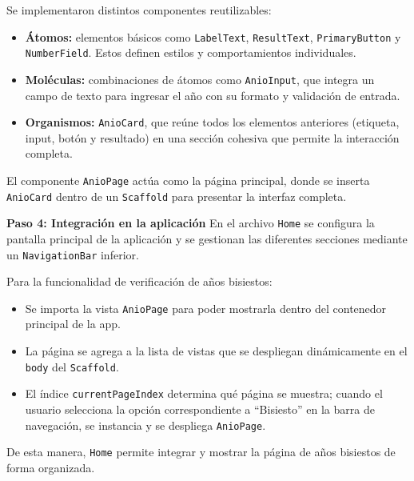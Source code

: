 Se implementaron distintos componentes reutilizables:  
\begin{itemize}
    \item \textbf{Átomos:} elementos básicos como \texttt{LabelText}, \texttt{ResultText}, \texttt{PrimaryButton} y \texttt{NumberField}. Estos definen estilos y comportamientos individuales.
    \item \textbf{Moléculas:} combinaciones de átomos como \texttt{AnioInput}, que integra un campo de texto para ingresar el año con su formato y validación de entrada.
    \item \textbf{Organismos:} \texttt{AnioCard}, que reúne todos los elementos anteriores (etiqueta, input, botón y resultado) en una sección cohesiva que permite la interacción completa.
\end{itemize}

El componente \texttt{AnioPage} actúa como la página principal, donde se inserta \texttt{AnioCard} dentro de un \texttt{Scaffold} para presentar la interfaz completa.  

\textbf{Paso 4: Integración en la aplicación}  
En el archivo \texttt{Home} se configura la pantalla principal de la aplicación y se gestionan las diferentes secciones mediante un \texttt{NavigationBar} inferior.  

Para la funcionalidad de verificación de años bisiestos:  
\begin{itemize}
    \item Se importa la vista \texttt{AnioPage} para poder mostrarla dentro del contenedor principal de la app.
    \item La página se agrega a la lista de vistas que se despliegan dinámicamente en el \texttt{body} del \texttt{Scaffold}.
    \item El índice \texttt{currentPageIndex} determina qué página se muestra; cuando el usuario selecciona la opción correspondiente a “Bisiesto” en la barra de navegación, se instancia y se despliega \texttt{AnioPage}.
\end{itemize}

De esta manera, \texttt{Home} permite integrar y mostrar la página de años bisiestos de forma organizada.
